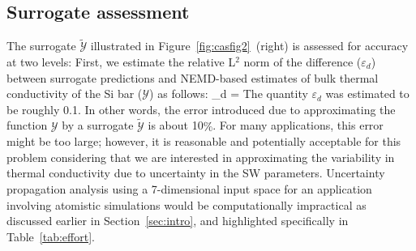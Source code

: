 \subsection{Surrogate assessment}
\label{sub:ver}

The surrogate $\tilde{\mathcal{Y}}$ illustrated in Figure~\ref{fig:casfig2}~(right) 
is assessed for accuracy at two levels: First, we estimate
 the relative L$^2$ norm of the difference
($\varepsilon_d$) between surrogate predictions and NEMD-based estimates of bulk thermal conductivity 
of the Si bar ($\mathcal{Y}$) as follows:
%
\be
\varepsilon_d = 
\ee
%
The quantity $\varepsilon_d$ was estimated to be roughly 0.1. In other words, the error introduced
due to approximating the function $\mathcal{Y}$ by a surrogate $\tilde{\mathcal{Y}}$ is about 10$\%$.
For many applications, this error might be too large; however, it is reasonable and
potentially acceptable for this problem considering that we are interested in approximating
the variability in thermal conductivity due to uncertainty in the SW
parameters. Uncertainty propagation analysis using a 7-dimensional input space for an application involving
atomistic simulations would be computationally impractical as discussed earlier in
Section~\ref{sec:intro}, and highlighted specifically in Table~\ref{tab:effort}.

